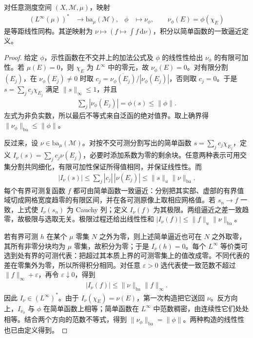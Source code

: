 \documentclass[../../main.tex]{subfiles}
\begin{document}
\begin{theorem}\label{theorem:ch06-linfty-ba-isometry}
对任意测度空间 $(X,\mathscr M,\mu)$，映射
\begin{align*}
(L^\infty(\mu))^*&\longrightarrow\mathrm{ba}_\mu(\mathscr M),&
\phi&\longmapsto\nu_\phi,\qquad\nu_\phi(E)=\phi(\chi_E)
\end{align*}
是等距线性同构。其逆映射为 $\nu\mapsto(f\mapsto\int f\,\mathrm d\nu)$，积分以简单函数的一致逼近定义。
\end{theorem}
\begin{proof}
给定 $\phi$，示性函数在不交并上的加法公式及 $\phi$ 的线性性给出 $\nu_\phi$ 的有限可加性。若 $\mu(E)=0$，则 $\chi_E$ 为 $L^\infty$ 中的零元，故 $\nu_\phi(E)=0$。对有限分割 $(E_j)$，在 $\nu_\phi(E_j)\ne0$ 时取 $c_j=\overline{\nu_\phi(E_j)}/|\nu_\phi(E_j)|$，否则取 $c_j=0$。于是 $s=\sum_jc_j\chi_{E_j}$ 满足 $\|s\|_\infty\leqslant1$，并且
\begin{align*}
\sum_j|\nu_\phi(E_j)|=\phi(s)\leqslant\|\phi\|.
\end{align*}
左式为非负实数，所以最后不等式来自泛函的绝对值界。取上确界得 $\|\nu_\phi\|_{\mathrm{ba}}\leqslant\|\phi\|$。

反过来，设 $\nu\in\mathrm{ba}_\mu(\mathscr M)$。对按不交可测分割写出的简单函数 $s=\sum_jc_j\chi_{E_j}$，定义 $I_\nu(s)=\sum_jc_j\nu(E_j)$，必要时添加系数为零的剩余块。任意两种表示可用交集分割共同细化，有限可加性保证所得值相同，并保证线性性。而
\begin{align*}
|I_\nu(s)|\leqslant\sum_j|c_j|\,|\nu(E_j)|
\leqslant\|s\|_u\|\nu\|_{\mathrm{ba}}.
\end{align*}
每个有界可测复函数 $f$ 都可由简单函数一致逼近：分别把其实部、虚部的有界值域切成网格宽度趋零的有限区间，并在各可测原像上取相应网格值。若 $s_n\to f$ 一致，上式使 $I_\nu(s_n)$ 为 Cauchy 列；定义 $I_\nu(f)$ 为其极限。两组逼近之差一致趋零，故极限与选取无关。极限过程还给出线性性和 $|I_\nu(f)|\leqslant\|f\|_u\|\nu\|_{\mathrm{ba}}$。

若有界可测 $h$ 在某个 $\mu$ 零集 $N$ 之外为零，则上述简单逼近也可在 $N$ 之外取零，其所有非零分块均为 $\mu$ 零集，故积分为零；于是 $I_\nu(h)=0$。每个 $L^\infty$ 等价类可选到处有界的可测代表：把超过其本质上界的可测零集上的值改成零。不同代表的差在零集外为零，所以所得积分相同。对任意 $\varepsilon>0$ 选代表使一致范数不超过 $\|f\|_\infty+\varepsilon$，再令 $\varepsilon\downarrow0$，得到
\begin{align*}
|I_\nu(f)|\leqslant\|\nu\|_{\mathrm{ba}}\|f\|_\infty.
\end{align*}
因此 $I_\nu\in(L^\infty)^*$。由于 $I_\nu(\chi_E)=\nu(E)$，第一次构造把它送回 $\nu$。反方向上，$I_{\nu_\phi}$ 与 $\phi$ 在简单函数上相等；简单函数在 $L^\infty$ 中范数稠密，由连续性它们处处相等。结合两个方向的范数不等式，得到 $\|\nu_\phi\|_{\mathrm{ba}}=\|\phi\|$。两种构造的线性性也已由定义得到。
\end{proof}
\end{document}
